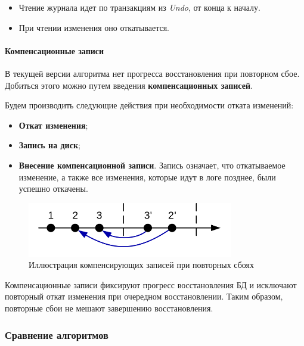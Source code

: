 \begin{itemize}
    \item Чтение журнала идет по транзакциям из \textit{Undo}, от конца к началу.
    \item При чтении изменения оно откатывается.
\end{itemize}

\paragraph{Компенсационные записи}

В текущей версии алгоритма нет прогресса восстановления при повторном сбое. Добиться этого можно
путем введения \textbf{компенсационных записей}.

Будем производить следующие действия при необходимости отката изменений:

\begin{itemize}
    \item \textbf{Откат изменения};
    \item \textbf{Запись на диск};
    \item \textbf{Внесение компенсационной записи}. Запись означает, что откатываемое изменение, а
        также все изменения, которые идут в логе позднее, были успешно откачены.
\end{itemize}

\begin{figure}[h]
    \centering
    \includegraphics[width=0.8\textwidth]{../assets/kgeorgiy/transactions/Recovery_ARIES.svg.png}
    \caption{Иллюстрация компенсирующих записей при повторных сбоях}
    \label{recovery-aries}
\end{figure}

\begin{proposition}
    Компенсационные записи фиксируют прогресс восстановления БД и исключают повторный откат
    изменения при очередном восстановлении. Таким образом, повторные сбои не мешают завершению
    восстановления.
\end{proposition}

\subsubsection{Сравнение алгоритмов}

